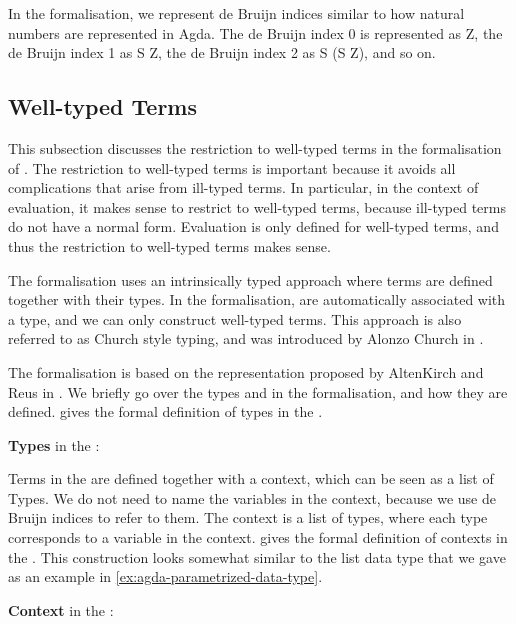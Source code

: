 In the formalisation, we represent de Bruijn indices similar to how natural numbers are represented in Agda.
The de Bruijn index 0 is represented as \textsf{Z}, the de Bruijn index 1 as \textsf{S Z}, the de Bruijn index 2 as \textsf{S (S Z)}, and so on.


\subsection{Well-typed Terms}

This subsection discusses the restriction to well-typed terms in the formalisation of \lab.
The restriction to well-typed terms is important because it avoids all complications that arise from ill-typed terms. 
In particular, in the context of evaluation, it makes sense to restrict to well-typed terms, 
because ill-typed terms do not have a normal form.
Evaluation is only defined for well-typed terms, and thus the restriction to well-typed terms makes sense.

The formalisation uses an intrinsically typed approach where terms are defined together with their types.
In the formalisation, \lterms are automatically associated with a type, and we can only construct well-typed terms.
This approach is also referred to as Church style typing, and was introduced by Alonzo Church in \cite{ALONZOCHURCH1940}.

The formalisation is based on the representation proposed by AltenKirch and Reus in \cite{THORSTENALTENKIRCH1999}.
We briefly go over the types and \lterms in the formalisation, and how they are defined. 
 gives the formal definition of types in the \lc. 

\begin{definition}
  \label{def:types:agda}
  \textbf{Types} in the \lc:
  
\end{definition}

Terms in the \lc are defined together with a context, which can be seen as a list of Types.
We do not need to name the variables in the context, because we use de Bruijn indices to refer to them.
The context is a list of types, where each type corresponds to a variable in the context.
 gives the formal definition of contexts in the \lc.
This construction looks somewhat similar to the list data type that we gave as an example in \cref{ex:agda-parametrized-data-type}.

\begin{definition}
  \label{def:context:agda}
  \textbf{Context} in the \lc:
  
\end{definition}

